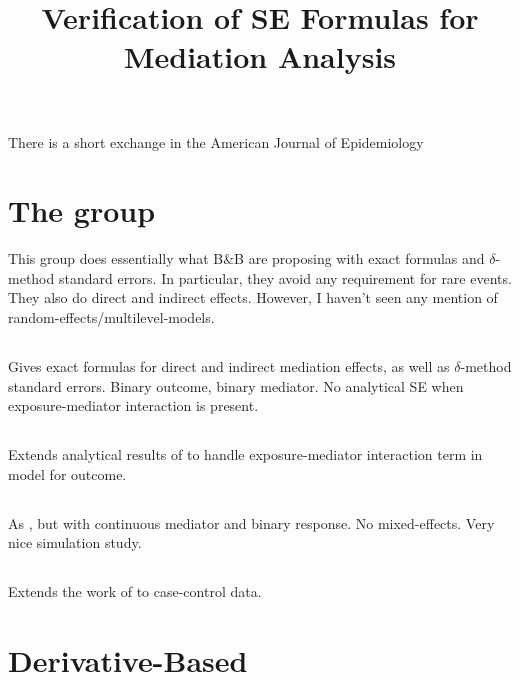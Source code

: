 \documentclass{article}
\title{Verification of SE Formulas for Mediation Analysis}
\begin{document}
\maketitle

There is a short exchange in the American Journal of Epidemiology

\section{The \citeauthor{Sam23} group}

This group does essentially what B\&B are proposing with exact formulas and $\delta$-method standard errors. In particular, they avoid any requirement for rare events. They also do direct and indirect effects. However, I haven't seen any mention of random-effects/multilevel-models.


\subsection{\citet{Sam18}}

Gives exact formulas for direct and indirect mediation effects, as well as $\delta$-method standard errors. Binary outcome, binary mediator. No analytical SE when exposure-mediator interaction is present.

\subsection{\citet{Sam21}}

Extends analytical results of \citet{Sam18} to handle exposure-mediator interaction term in model for outcome.

\subsection{\citet{Sam23}}

As \citet{Sam18}, but with continuous mediator and binary response. No mixed-effects. Very nice simulation study.

\subsection{\citet{Cau24}}

Extends the work of \citet{Sam23} to case-control data.

\section{Derivative-Based}
\end{document}
